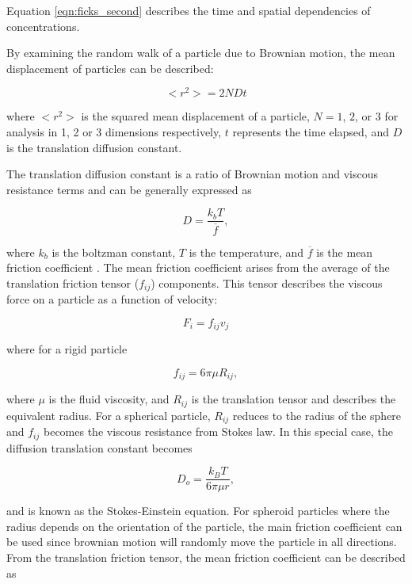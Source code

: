 \noindent Equation \ref{eqn:ficks_second} describes the time and spatial dependencies of concentrations.

\par By examining the random walk of a particle due to Brownian motion, the mean displacement of particles can be described:

\begin{equation}
    \Big< r^2 \Big> = 2 N D t
\end{equation}

\noindent where $<r^2>$ is the squared mean displacement of a particle, $N = 1$, $2$, or $3$ for analysis in 1, 2 or 3 dimensions respectively, $t$ represents the time elapsed, and $D$ is the translation diffusion constant. 

\par The translation diffusion constant is a ratio of Brownian motion and viscous resistance terms and can be generally expressed as 

\begin{equation}
    D = \frac{k_bT}{\overline{f}},
\end{equation}

\noindent where $k_b$ is the boltzman constant, $T$ is the temperature, and $\overline{f}$ is the mean friction coefficient \cite{perrin from hydrochemical}. The mean friction coefficient arises from the average of the translation friction tensor ($f_{ij}$) components. This tensor describes the viscous force on a particle as a function of velocity:

\begin{equation}
    F_i = f_{ij}v_j
\end{equation}

\noindent where for a rigid particle

\begin{equation}
    f_{ij} = 6\pi \mu R_{ij},
\end{equation}

\noindent where $\mu$ is the fluid viscosity, and $R_{ij}$ is the translation tensor and describes the equivalent radius. For a spherical particle, $R_{ij}$ reduces to the radius of the sphere and $f_{ij}$ becomes the viscous resistance from Stokes law. In this special case, the diffusion translation constant becomes

\begin{equation}
    D_o = \frac{k_BT}{6 \pi \mu r},
\end{equation}

and is known as the Stokes-Einstein equation. For spheroid particles where the radius depends on the orientation of the particle, the main friction coefficient can be used since brownian motion will randomly move the particle in all directions. From the translation friction tensor, the mean friction coefficient can be described as 

